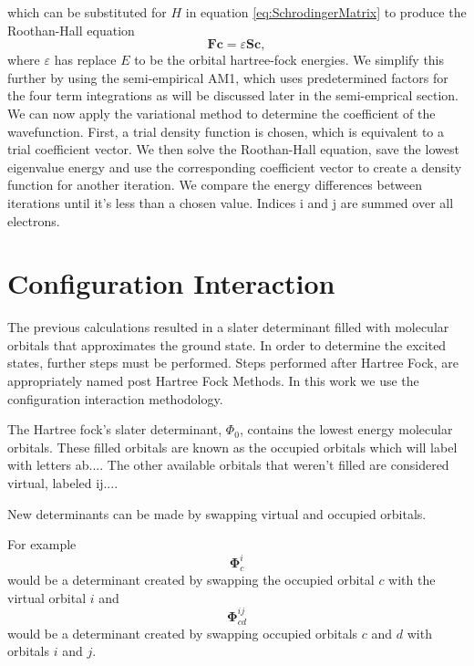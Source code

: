         which can be substituted for $H$ in equation \ref{eq:SchrodingerMatrix} to produce the Roothan-Hall equation
        \begin{equation}
          \mathbf{Fc}=\varepsilon\mathbf{Sc},
        \end{equation}
        where $\varepsilon$ has replace $E$ to be the orbital hartree-fock energies.
        We simplify this further by using the semi-empirical AM1, which uses predetermined factors for the four term integrations as will be discussed later in the semi-emprical section.
        We can now apply the variational method to determine the coefficient of the wavefunction.
        First, a trial density function is chosen, which is equivalent to a trial coefficient vector.
        We then solve the Roothan-Hall equation, save the lowest eigenvalue energy and use the corresponding coefficient vector to create a density function for another iteration.
        We compare the energy differences between iterations until it's less than a chosen value. 
        Indices i and j are summed over all electrons.

\section{Configuration Interaction}
	The previous calculations resulted in a slater determinant filled with molecular orbitals that approximates the ground state.
	In order to determine the excited states, further steps must be performed.
	Steps performed after Hartree Fock, are appropriately named post Hartree Fock Methods.
	In this work we use the configuration interaction methodology.

	The Hartree fock's slater determinant, \(\Phi_0\), contains the lowest energy molecular orbitals.
	These filled orbitals are known as the occupied orbitals which will label with letters ab....
	The other available orbitals that weren't filled are considered virtual, labeled ij....

	New determinants can be made by swapping virtual and occupied orbitals.

	For example
	\begin{equation}
	  \bm{\Phi}_c^i
	\end{equation}
	would be a determinant created by swapping the occupied orbital \(c\) with the virtual orbital \(i\) and
	\begin{equation}
	  \bm{\Phi}_{cd}^{ij}
	\end{equation}
	would be a determinant created by swapping occupied orbitals \(c\) and \(d\) with orbitals \(i\) and \(j\).

